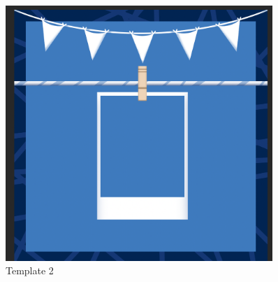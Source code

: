 \begin{figure}[htp]
\centering
\includegraphics[width=0.9\textwidth, angle=0]{Meetings/August/08-24-21/2.PNG}
\caption{Template 2}
\label{fig:pic2}
\end{figure}
